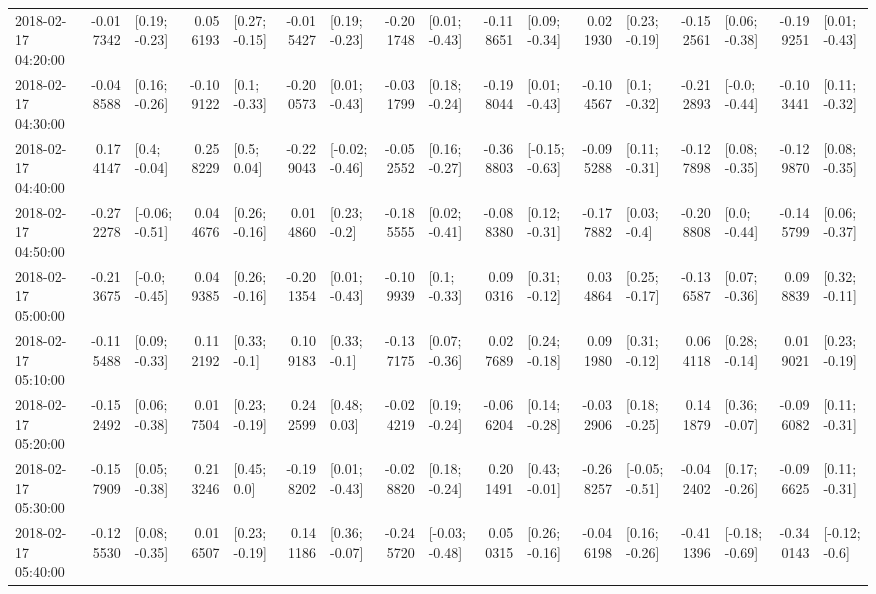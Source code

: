 \begin{tabular}{lrlrlrlrlrlrlrlrl}
2018-02-17 04:20:00 & -0.017342 &   [0.19; -0.23] &  0.056193 &   [0.27; -0.15] & -0.015427 &   [0.19; -0.23] & -0.201748 &   [0.01; -0.43] & -0.118651 &   [0.09; -0.34] &  0.021930 &   [0.23; -0.19] & -0.152561 &   [0.06; -0.38] & -0.199251 &   [0.01; -0.43] \\
2018-02-17 04:30:00 & -0.048588 &   [0.16; -0.26] & -0.109122 &    [0.1; -0.33] & -0.200573 &   [0.01; -0.43] & -0.031799 &   [0.18; -0.24] & -0.198044 &   [0.01; -0.43] & -0.104567 &    [0.1; -0.32] & -0.212893 &   [-0.0; -0.44] & -0.103441 &   [0.11; -0.32] \\
2018-02-17 04:40:00 &  0.174147 &    [0.4; -0.04] &  0.258229 &     [0.5; 0.04] & -0.229043 &  [-0.02; -0.46] & -0.052552 &   [0.16; -0.27] & -0.368803 &  [-0.15; -0.63] & -0.095288 &   [0.11; -0.31] & -0.127898 &   [0.08; -0.35] & -0.129870 &   [0.08; -0.35] \\
2018-02-17 04:50:00 & -0.272278 &  [-0.06; -0.51] &  0.044676 &   [0.26; -0.16] &  0.014860 &    [0.23; -0.2] & -0.185555 &   [0.02; -0.41] & -0.088380 &   [0.12; -0.31] & -0.177882 &    [0.03; -0.4] & -0.208808 &    [0.0; -0.44] & -0.145799 &   [0.06; -0.37] \\
2018-02-17 05:00:00 & -0.213675 &   [-0.0; -0.45] &  0.049385 &   [0.26; -0.16] & -0.201354 &   [0.01; -0.43] & -0.109939 &    [0.1; -0.33] &  0.090316 &   [0.31; -0.12] &  0.034864 &   [0.25; -0.17] & -0.136587 &   [0.07; -0.36] &  0.098839 &   [0.32; -0.11] \\
2018-02-17 05:10:00 & -0.115488 &   [0.09; -0.33] &  0.112192 &    [0.33; -0.1] &  0.109183 &    [0.33; -0.1] & -0.137175 &   [0.07; -0.36] &  0.027689 &   [0.24; -0.18] &  0.091980 &   [0.31; -0.12] &  0.064118 &   [0.28; -0.14] &  0.019021 &   [0.23; -0.19] \\
2018-02-17 05:20:00 & -0.152492 &   [0.06; -0.38] &  0.017504 &   [0.23; -0.19] &  0.242599 &    [0.48; 0.03] & -0.024219 &   [0.19; -0.24] & -0.066204 &   [0.14; -0.28] & -0.032906 &   [0.18; -0.25] &  0.141879 &   [0.36; -0.07] & -0.096082 &   [0.11; -0.31] \\
2018-02-17 05:30:00 & -0.157909 &   [0.05; -0.38] &  0.213246 &     [0.45; 0.0] & -0.198202 &   [0.01; -0.43] & -0.028820 &   [0.18; -0.24] &  0.201491 &   [0.43; -0.01] & -0.268257 &  [-0.05; -0.51] & -0.042402 &   [0.17; -0.26] & -0.096625 &   [0.11; -0.31] \\
2018-02-17 05:40:00 & -0.125530 &   [0.08; -0.35] &  0.016507 &   [0.23; -0.19] &  0.141186 &   [0.36; -0.07] & -0.245720 &  [-0.03; -0.48] &  0.050315 &   [0.26; -0.16] & -0.046198 &   [0.16; -0.26] & -0.411396 &  [-0.18; -0.69] & -0.340143 &   [-0.12; -0.6] \\

\end{tabular}
